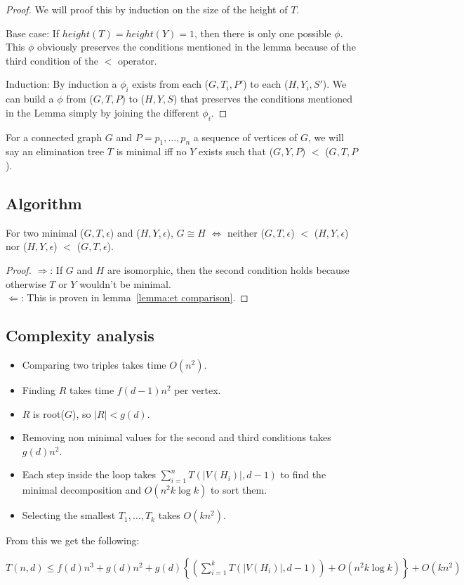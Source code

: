 \begin{proof}
We will proof this by induction on the size of the height of $T$.

Base case: 
If $height(T) = height(Y) = 1$, then there is only one possible $\phi$. This $\phi$ obviously preserves the conditions mentioned in the lemma because of the third condition of the $<$ operator.

Induction:
By induction a $\phi_i$ exists from each ($G, T_i, P'$) to each ($H, Y_i, S'$). We can build a $\phi$ from ($G, T, P$) to ($H, Y, S$) that preserves the conditions mentioned in the Lemma simply by joining the different $\phi_i$.
\end{proof}
 
\begin{definition}
For a connected graph $G$ and $P = p_1,\ldots, p_n$ a sequence of vertices of $G$, we will say an elimination tree $T$ is minimal iff no $Y$ exists such that ($G, Y, P$) $<$ ($G, T, P$).
\end{definition}

\subsection{Algorithm}
\begin{lemma}
For two minimal ($G, T, \epsilon$) and ($H, Y, \epsilon$), $G \cong H$ $\iff$ neither ($G, T, \epsilon$) $<$ ($H, Y, \epsilon$) nor ($H, Y, \epsilon$) $<$ ($G, T, \epsilon$).
\end{lemma}

\begin{proof}
$\Longrightarrow$: If $G$ and $H$ are isomorphic, then the second condition holds because otherwise $T$ or $Y$ wouldn't be minimal.\\
$\Longleftarrow$: This is proven in lemma~\ref{lemma:et comparison}.
\end{proof}



\subsection{Complexity analysis}

\begin{itemize}
\item Comparing two triples takes time $O(n^2)$.
\item Finding $R$ takes time $f(d-1)n^2$ per vertex.
\item $R$ is root($G$), so $|R| < g(d)$.
\item Removing non minimal values for the second and third conditions takes $g(d)n^2$.
\item Each step inside the loop takes $\sum\limits_{i=1}^n T(|V(H_i)|, d-1)$ to find the minimal decomposition and $O(n^2 k \log k)$ to sort them.
\item Selecting the smallest $T_1,\ldots, T_k$ takes $O(kn^2)$.
\end{itemize}

From this we get the following:

$T(n, d) \leq f(d)n^3 + g(d)n^2 + g(d) \left\{ \left(\sum\limits_{i=1}^k T(|V(H_i)|, d-1)\right) + O(n^2 k \log k) \right\} + O(kn^2)$
